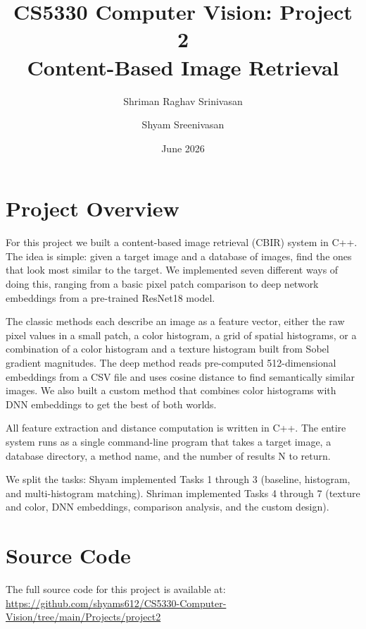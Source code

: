 \documentclass[11pt,letterpaper]{article}
\title{\textbf{CS5330 Computer Vision: Project 2}\\
       \large Content-Based Image Retrieval}
\author{Shriman Raghav Srinivasan \and Shyam Sreenivasan}
\date{June 2026}
\begin{document}
\maketitle

\section*{Project Overview}

For this project we built a content-based image retrieval (CBIR) system in C++.
The idea is simple: given a target image and a database of images, find the ones
that look most similar to the target. We implemented seven different ways of doing
this, ranging from a basic pixel patch comparison to deep network embeddings from
a pre-trained ResNet18 model.

The classic methods each describe an image as a feature vector, either the raw
pixel values in a small patch, a color histogram, a grid of spatial histograms, or
a combination of a color histogram and a texture histogram built from Sobel gradient
magnitudes. The deep method reads pre-computed 512-dimensional embeddings from a CSV
file and uses cosine distance to find semantically similar images. We also built a
custom method that combines color histograms with DNN embeddings to get the best of
both worlds.

All feature extraction and distance computation is written in C++. The entire system
runs as a single command-line program that takes a target image, a database directory,
a method name, and the number of results N to return.

We split the tasks: Shyam implemented Tasks 1 through 3 (baseline, histogram, and
multi-histogram matching). Shriman implemented Tasks 4 through 7 (texture and color,
DNN embeddings, comparison analysis, and the custom design).

\section*{Source Code}

The full source code for this project is available at:\\
\url{https://github.com/shyams612/CS5330-Computer-Vision/tree/main/Projects/project2}
\end{document}
